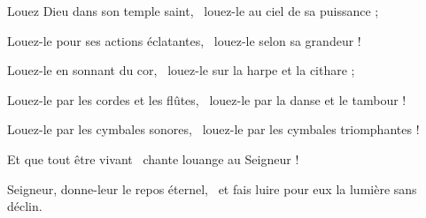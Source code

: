 \item Louez Dieu dans son temple saint,~\psstar{} louez-le au ciel de sa puissance ;

\item Louez-le pour ses actions éclatantes,~\psstar{} louez-le selon sa grandeur !

\item Louez-le en sonnant du cor,~\psstar{} louez-le sur la harpe et la cithare ;

\item Louez-le par les cordes et les flûtes,~\psstar{} louez-le par la danse et le tambour !

\item Louez-le par les cymbales sonores,~\psstar{} louez-le par les cymbales triomphantes !

\item Et que tout être vivant~\psstar{} chante louange au Seigneur !

\item Seigneur, donne-leur le repos éternel,~\psstar{} et fais luire pour eux la lumière sans déclin.